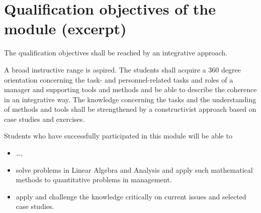 \chapter*{Qualification objectives of the module (excerpt)}
The qualification objectives shall be reached by an integrative
approach.

\medskip
\noindent
A broad instructive range is aspired. The students shall acquire
a 360 degree orientation concerning the task- and
personnel-related tasks and roles of a manager and supporting
tools and methods and be able to describe the coherence in an
integrative way. The knowledge concerning the tasks and the
understanding of methods and tools shall be strengthened by a
constructivist approach based on case studies and exercises.

\medskip
\noindent
Students who have successfully participated in this module
will be able to
%
\begin{itemize}
\item \ldots,
\item solve problems in Linear Algebra and Analysis and
apply such mathematical methods to quantitative problems
in management.
\item apply and challenge the knowledge critically on
current issues and selected case studies.
\end{itemize}
%

